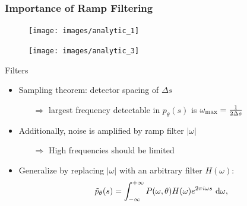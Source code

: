 \begin{frame}
	\frametitle{Importance of Ramp Filtering}

	\begin{figure}[tb]
		\centering
		\begin{minipage}{.4\linewidth}
			\centering
			\texttt{[image: images/analytic\_1]}
			\label{fig:ct_analytic_1}
		\end{minipage}%
		\hspace{1.3cm}
		\begin{minipage}{.4\linewidth}
			\centering
			\texttt{[image: images/analytic\_3]}
			\label{fig:ct_analytic_3}
		\end{minipage}
	\end{figure}

\end{frame}

\begin{frame}[c]{Filters}

	\begin{itemize}
		\setlength\itemsep{0.5cm}
		\item Sampling theorem: detector spacing of $\Delta s$
		      \begin{itemize}
			      \item[$\Rightarrow$] largest frequency detectable in $p_\theta(s)$ is $\omega_{\textnormal{max}} = \frac{1}{2\Delta s}$
		      \end{itemize}
		\item Additionally, noise is amplified by ramp filter $|\omega|$
		      \begin{itemize}
			      \item[$\Rightarrow$] High frequencies should be limited
		      \end{itemize}
		\item Generalize by replacing $|\omega|$ with an arbitrary filter $H(\omega)$:
		      \begin{equation}
			      \tilde{p}_{\theta}(s) = \int_{-\infty}^{+\infty} P(\omega, \theta) H(\omega) e^{2 \pi i \omega s} \ \textnormal d\omega,
		      \end{equation}

	\end{itemize}

\end{frame}

